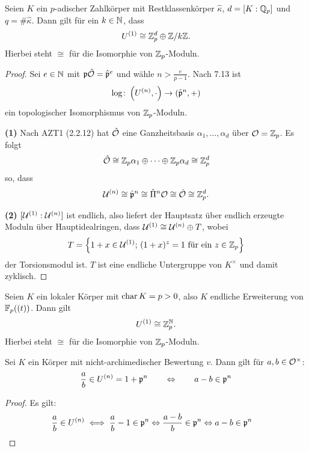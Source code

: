 

\begin{Prop}
	Seien $K$ ein $p$-adischer Zahlkörper mit Restklassenkörper $\hat{\kappa}$, $d =[K:\mathbb{Q}_p]$ und $q=\# \hat{\kappa}$. Dann gilt für ein $k\in \mathbb{N}$, dass
	\[ U^{(1)} \cong \mathbb{Z}_p^d \oplus \mathbb{Z} /k\mathbb{Z}.
	\]
	Hierbei steht $\cong$ für die Isomorphie von $\mathbb{Z}_p$-Moduln.
\end{Prop}


\begin{proof}
	Sei $e\in\mathbb{N}$ mit $\mathfrak{p} \hat{\mathcal{O}} = \hat{\mathfrak{p}}^e$ und wähle $n>\frac{e}{p-1}$.
	Nach 7.13 ist
	\[ \log \colon \left( U^{(n)} , \cdot \right) \to \left( \hat{\mathfrak{p}}^n, + \right)
	\]
	ein topologischer Isomorphismus von $\mathbb{Z}_p$-Moduln. 
	
	\bigskip \textbf{(1)} Nach AZT1 (2.2.12) hat $\hat{\mathcal{O}}$ eine Ganzheitsbasis $\alpha_1,\dots,\alpha_d$ über $\mathcal{O} = \mathbb{Z}_p$. Es folgt
	\[ \hat{\mathcal{O}} \cong \mathbb{Z}_p \alpha_1 \oplus \cdots \oplus \mathbb{Z}_p \alpha_d \cong \mathbb{Z}_p^d
	\]
	so, dass
	\[ \mathcal{U}^{(n)} \cong \hat{\mathfrak{p}}^n  \cong \hat{\Pi}^n \mathcal{O} \cong \hat{\mathcal{O}} \cong \mathbb{Z}_p^d.
	\]
	
	\bigskip \textbf{(2)} $[\mathcal{U}^{(1)}:\mathcal{U}^{(n)}]$ ist endlich, also liefert der Hauptsatz über endlich erzeugte Moduln über Hauptidealringen, dass $\mathcal{U}^{(1)} \cong \mathcal{U}^{(n)} \oplus T$, wobei
	\[ T = \left\{
	1+x \in \mathcal{U}^{(1)}; \, (1+x)^z = 1 \text{ für ein } z \in \mathbb{Z}_p
	\right\}
	\]
	der Torsionsmodul ist. $T$ ist eine endliche Untergruppe von $K^\times$ und damit zyklisch.
\end{proof}

\begin{Prop}
	Seien $K$ ein lokaler Körper mit $\operatorname{char} K = p>0$, also $K$ endliche Erweiterung von $\mathbb{F}_p((t))$.
	Dann gilt
	\[ U^{(1)} \cong \mathbb{Z}_p^{\mathbb{N}}.
	\]
	Hierbei steht $\cong$ für die Isomorphie von $\mathbb{Z}_p$-Moduln.
\end{Prop}

\begin{Vorüberlegung}
	Sei $K$ ein Körper mit nicht-archimedischer Bewertung $v$. Dann gilt für $a,b \in \mathcal{O}^\times$:
	\[ \frac{a}{b} \in U^{(n)} = 1 +\mathfrak{p}^n \qquad \Leftrightarrow \qquad a-b \in \mathfrak{p}^n
	\]
\end{Vorüberlegung}

\begin{proof} Es gilt:
	\begin{align*}
	\frac{a}{b} \in U^{(n)}
	&\iff \frac{a}{b} - 1 \in \mathfrak{p}^n 
	\Leftrightarrow \frac{a-b}{b} \in\mathfrak{p}^n
	\Leftrightarrow a-b\in\mathfrak{p}^n
	\end{align*}
\end{proof}



